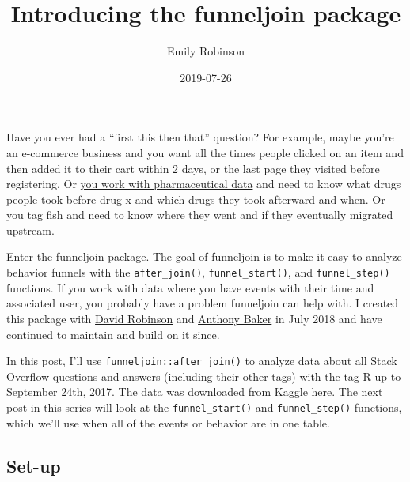 \documentclass[]{article}
\title{Introducing the funneljoin package}
\author{Emily Robinson}
\date{2019-07-26}
\newenvironment{Shaded}{\begin{snugshade}}{\end{snugshade}}
\newcommand{\KeywordTok}[1]{\textcolor[rgb]{0.13,0.29,0.53}{\textbf{#1}}}
\newcommand{\DataTypeTok}[1]{\textcolor[rgb]{0.13,0.29,0.53}{#1}}
\newcommand{\DecValTok}[1]{\textcolor[rgb]{0.00,0.00,0.81}{#1}}
\newcommand{\StringTok}[1]{\textcolor[rgb]{0.31,0.60,0.02}{#1}}
\newcommand{\OtherTok}[1]{\textcolor[rgb]{0.56,0.35,0.01}{#1}}
\newcommand{\OperatorTok}[1]{\textcolor[rgb]{0.81,0.36,0.00}{\textbf{#1}}}
\newcommand{\NormalTok}[1]{#1}
\begin{document}
\maketitle

Have you ever had a ``first this then that'' question? For example,
maybe you're an e-commerce business and you want all the times people
clicked on an item and then added it to their cart within 2 days, or the
last page they visited before registering. Or
\href{https://twitter.com/scottishnp/status/1154657704578695168?s=20}{you
work with pharmaceutical data} and need to know what drugs people took
before drug x and which drugs they took afterward and when. Or you
\href{https://twitter.com/Voovarb/status/1154445792125394945?s=20}{tag
fish} and need to know where they went and if they eventually migrated
upstream.

Enter the funneljoin package. The goal of funneljoin is to make it easy
to analyze behavior funnels with the \texttt{after\_join()},
\texttt{funnel\_start()}, and \texttt{funnel\_step()} functions. If you
work with data where you have events with their time and associated
user, you probably have a problem funneljoin can help with. I created
this package with \href{https://twitter.com/drob}{David Robinson} and
\href{https://www.linkedin.com/in/awbaker1/}{Anthony Baker} in July 2018
and have continued to maintain and build on it since.

In this post, I'll use \texttt{funneljoin::after\_join()} to analyze
data about all Stack Overflow questions and answers (including their
other tags) with the tag R up to September 24th, 2017. The data was
downloaded from Kaggle
\href{https://www.kaggle.com/stackoverflow/rquestions/downloads/rquestions.zip/3}{here}.
The next post in this series will look at the \texttt{funnel\_start()}
and \texttt{funnel\_step()} functions, which we'll use when all of the
events or behavior are in one table.

\subsection{Set-up}\label{set-up}

\begin{Shaded}
\end{Shaded}
\end{document}
